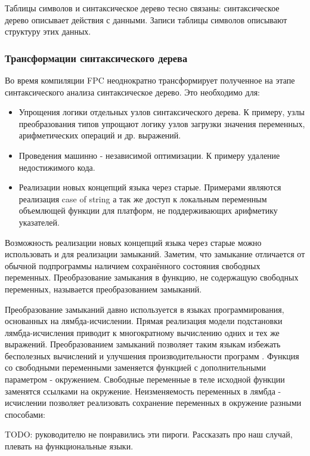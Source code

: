 \documentclass{imcs}
\begin{document}
Таблицы символов и синтаксическое дерево тесно связаны: синтаксическое дерево описывает действия с
данными. Записи таблицы символов описывают структуру этих данных.

\subsubsection{Трансформации синтаксического дерева}

Во время компиляции FPC неоднократно трансформирует полученное на этапе синтаксического 
анализа синтаксическое дерево. Это необходимо для:
\begin{itemize}
    \item Упрощения логики отдельных узлов синтаксического дерева. К 
примеру, узлы преобразования типов упрощают логику узлов загрузки значения переменных,
арифметических операций и др. выражений.
    \item Проведения машинно - независимой оптимизации. К примеру удаление недостижимого
кода.
    \item Реализации новых концепций языка через старые. Примерами являются реализация
case of string\cite{misha} а так же доступ к локальным переменным объемлющей функции для
платформ, не поддерживающих арифметику указателей.
\end{itemize}      

Возможность реализации новых концепций языка через старые можно использовать и
для реализации замыканий. Заметим, что замыкание отличается от 
обычной подпрограммы наличием сохранённого состояния свободных переменных. Преобразование
замыкания в функцию, не содержащую свободных переменных, называется преобразованием
замыканий\cite{moderncompiler}.

Преобразование замыканий давно используется в языках программирования, основанных на
лямбда-исчислении. Прямая реализация модели подстановки
лямбда-исчисления приводит к многократному вычислению одних и тех же выражений.
Преобразованием замыканий позволяет таким языкам избежать бесполезных вычислений
и улучшения производительности программ \cite{lambdaclosure95}. 
Функция со свободными переменными
заменяется функцией с дополнительными параметром - окружением. Свободные переменные
в теле исходной функции заменятся ссылками на окружение.  
Неизменяемость переменных в лямбда - исчислении позволяет реализовать сохранение
переменных в окружение разными способами:

\iffalse TODO: руководителю не понравились эти пироги. Рассказать про наш случай, плевать
на функциональные языки.
\end{document}
